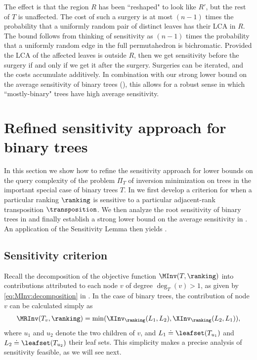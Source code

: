 \documentclass{toc}
\begin{document}
The effect is that the region $R$ has been ``reshaped" to look like $R'$, but the rest of $T$ is unaffected. The cost of such a surgery is at most $(n-1)$ times the probability that a 
uniformly random pair of distinct leaves has their LCA in $R$. The bound follows from thinking of sensitivity as $(n-1)$ times the probability that a uniformly random edge in the full permutahedron is bichromatic. Provided the LCA of 
the affected leaves is outside $R$, then we get sensitivity before the surgery if and only if we get it after the surgery. Surgeries can be iterated, and the costs accumulate additively. In combination with our strong lower bound on the average sensitivity of binary trees (), this allows for a robust sense in which ``mostly-binary" trees have high average sensitivity.



\section{Refined sensitivity approach for binary trees}
\label{sec:sensitivity:binary}

In this section we show how to refine the sensitivity approach for lower bounds on the query complexity of the problem $\Pi_T$ of inversion minimization on trees in the important special case of binary trees $T$. In  we first develop a criterion for when a particular ranking $\ranking$ is sensitive to a particular adjacent-rank transposition $\transposition$.
We then analyze the root sensitivity of binary trees in  and finally establish a strong lower bound on the average sensitivity in . An application of the Sensitivity Lemma then yields .

\subsection{Sensitivity criterion}
\label{sec:binary:criterion}

Recall the decomposition of the objective function $\MInv(T,\ranking)$ into contributions attributed to each node $v$ of degree $\deg_T(v)>1$, as given by \eqref{eq:MInv:decomposition} in . In the case of binary trees, the contribution of node $v$ can be calculated simply as
\begin{equation}\label{eq:contribution:binary:retake}
\MRInv(T_v,\ranking) = \min(\XInv_\ranking(L_1,L_2),\XInv_\ranking(L_2,L_1)),
\end{equation}
where $u_1$ and $u_2$ denote the two children of $v$, and $L_1 \doteq \leafset(T_{u_1})$ and $L_2 \doteq \leafset(T_{u_2})$ their leaf sets. This simplicity makes a precise analysis of sensitivity feasible, as we will see next. 
\end{document}
